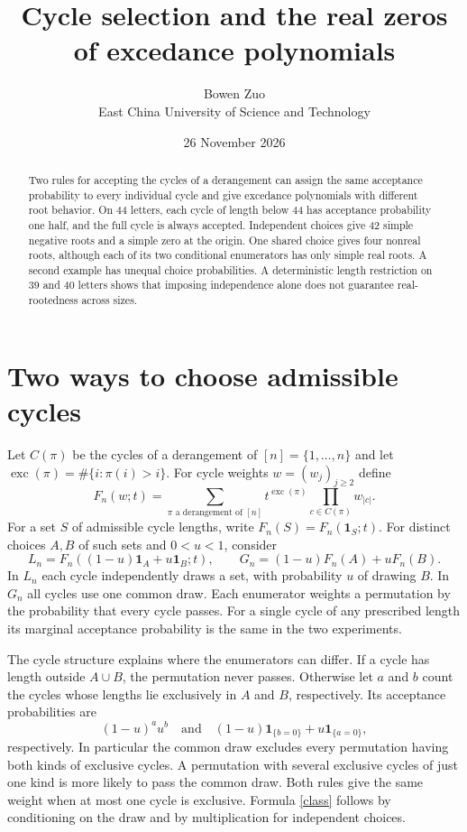 \documentclass[11pt]{article}
\title{Cycle selection and the real zeros of excedance polynomials}
\author{Bowen Zuo\\{\small East China University of Science and Technology}}
\date{26 November 2026}
\newcommand{\exc}{\operatorname{exc}}
\begin{document}
\maketitle
\begin{abstract}
Two rules for accepting the cycles of a derangement can assign the same acceptance probability to every individual cycle and give excedance polynomials with different root behavior. On 44 letters, each cycle of length below 44 has acceptance probability one half, and the full cycle is always accepted. Independent choices give 42 simple negative roots and a simple zero at the origin. One shared choice gives four nonreal roots, although each of its two conditional enumerators has only simple real roots. A second example has unequal choice probabilities. A deterministic length restriction on 39 and 40 letters shows that imposing independence alone does not guarantee real-rootedness across sizes.
\end{abstract}

\section{Two ways to choose admissible cycles}
Let $C(\pi)$ be the cycles of a derangement of $[n]=\{1,\ldots,n\}$ and let $\exc(\pi)=\#\{i:\pi(i)>i\}$. For cycle weights $w=(w_j)_{j\ge2}$ define
\[
 F_n(w;t)=\sum_{\pi\text{ a derangement of }[n]}t^{\exc(\pi)}
                  \prod_{c\in C(\pi)} w_{|c|}.
\]
For a set $S$ of admissible cycle lengths, write $F_n(S)=F_n(\mathbf1_S;t)$. For distinct choices $A,B$ of such sets and $0<u<1$, consider
\[
 L_n=F_n((1-u)\mathbf1_A+u\mathbf1_B;t),\qquad
 G_n=(1-u)F_n(A)+u F_n(B).
\]
In $L_n$ each cycle independently draws a set, with probability $u$ of drawing $B$. In $G_n$ all cycles use one common draw. Each enumerator weights a permutation by the probability that every cycle passes. For a single cycle of any prescribed length its marginal acceptance probability is the same in the two experiments.

The cycle structure explains where the enumerators can differ. If a cycle has length outside $A\cup B$, the permutation never passes. Otherwise let $a$ and $b$ count the cycles whose lengths lie exclusively in $A$ and $B$, respectively. Its acceptance probabilities are
\begin{equation}\label{class}
 (1-u)^a u^b\quad\text{and}\quad
 (1-u)\mathbf1_{\{b=0\}}+u\mathbf1_{\{a=0\}},
\end{equation}
respectively. In particular the common draw excludes every permutation having both kinds of exclusive cycles. A permutation with several exclusive cycles of just one kind is more likely to pass the common draw. Both rules give the same weight when at most one cycle is exclusive. Formula \eqref{class} follows by conditioning on the draw and by multiplication for independent choices.
\end{document}
